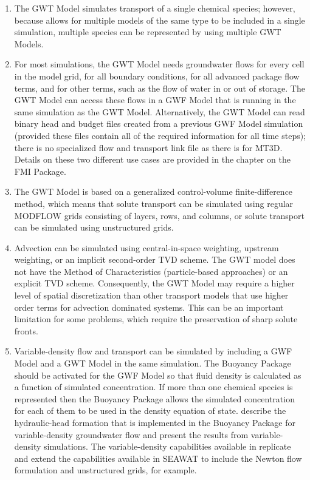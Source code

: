 \begin{enumerate}

\item The GWT Model simulates transport of a single chemical species; however, because \mf allows for multiple models of the same type to be included in a single simulation, multiple species can be represented by using multiple GWT Models.

\item For most simulations, the GWT Model needs groundwater flows for every cell in the model grid, for all boundary conditions, for all advanced package flow terms, and for other terms, such as the flow of water in or out of storage.  The GWT Model can access these flows in a GWF Model that is running in the same simulation as the GWT Model.  Alternatively, the GWT Model can read binary head and budget files created from a previous GWF Model simulation (provided these files contain all of the required information for all time steps); there is no specialized flow and transport link file \citep{zheng2001modflow} as there is for MT3D.  Details on these two different use cases are provided in the chapter on the FMI Package.

\item The GWT Model is based on a generalized control-volume finite-difference method, which means that solute transport can be simulated using regular MODFLOW grids consisting of layers, rows, and columns, or solute transport can be simulated using unstructured grids.

\item Advection can be simulated using central-in-space weighting, upstream weighting, or an implicit second-order TVD scheme.  The GWT model does not have the Method of Characteristics (particle-based approaches) or an explicit TVD scheme.  Consequently, the GWT Model may require a higher level of spatial discretization than other transport models that use higher order terms for advection dominated systems.  This can be an important limitation for some problems, which require the preservation of sharp solute fronts. 

\item Variable-density flow and transport can be simulated by including a GWF Model and a GWT Model in the same \mf simulation.  The Buoyancy Package should be activated for the GWF Model so that fluid density is calculated as a function of simulated concentration.  If more than one chemical species is represented then the Buoyancy Package allows the simulated concentration for each of them to be used in the density equation of state.   \cite{langevin2020hydraulic} describe the hydraulic-head formation that is implemented in the Buoyancy Package for variable-density groundwater flow and present the results from \mf variable-density simulations.  The variable-density capabilities available in \mf replicate and extend the capabilities available in SEAWAT to include the Newton flow formulation and unstructured grids, for example.  


\end{enumerate}
